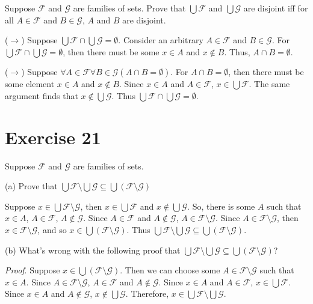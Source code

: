 \documentclass[11pt]{article}
\newcommand{\family}[1]{\mathcal{#1}}
\begin{document}
Suppose $\family{F}$ and $\family{G}$ are families of sets. Prove that 
$\bigcup \family{F}$ and $\bigcup \family{G}$ are disjoint iff for all 
$A \in \family{F}$ and $B \in \family{G}$, $A$ and $B$ are disjoint.

($\rightarrow$) Suppose $\bigcup \family{F} \cap \bigcup \family{G} = \emptyset$.
Consider an arbitrary $A \in \family{F}$ and $B \in \family{G}$. For 
$\bigcup \family{F} \cap \bigcup \family{G} = \emptyset$, then there must be 
some $x \in A$ and $x \notin B$. Thus, $A \cap B = \emptyset$.

($\rightarrow$) Suppose 
$\forall A \in \family{F} \forall B \in \family{G} (A \cap B = \emptyset)$. For 
$A \cap B = \emptyset$, then there must be some element $x \in A$ and $x \notin B$.
Since $x \in A$ and $A \in \family{F}$, $x \in \bigcup \family{F}$. The same 
argument finds that $x \notin \bigcup \family{G}$. 
Thus $\bigcup \family{F} \cap \bigcup \family{G} = \emptyset$.

\section*{Exercise 21}

Suppose $\family{F}$ and $\family{G}$ are families of sets.

\noindent (a) Prove that 
$\bigcup \family{F} \setminus \bigcup \family{G} \subseteq \bigcup (\family{F} \setminus \family{G})$

Suppose $x \in \bigcup \family{F} \setminus \family{G}$, then 
$x \in \bigcup \family{F}$ and $x \notin \bigcup \family{G}$. So, there is some 
$A$ such that $x \in A$, $A \in \family{F}$, $A \notin \family{G}$. Since 
$A \in \family{F}$ and $A \notin \family{G}$, 
$A \in \family{F} \setminus \family{G}$. Since 
$A \in \family{F} \setminus \family{G}$, then 
$x \in \family{F} \setminus \family{G}$, and so 
$x \in \bigcup (\family{F} \setminus \family{G})$. Thus 
$\bigcup \family{F} \setminus \bigcup \family{G} \subseteq \bigcup (\family{F} \setminus \family{G})$.

\noindent (b) What's wrong with the following proof that 
$\bigcup \family{F} \setminus \bigcup \family{G} \subseteq \bigcup (\family{F} \setminus \family{G})$?

\textit{Proof}. Suppose $x \in \bigcup (\family{F} \setminus \family{G})$. 
Then we can choose some $A \in \family{F} \setminus \family{G}$ such that 
$x \in A$. Since $A \in \family{F} \setminus \family{G}$, $A \in \family{F}$
and $A \notin \family{G}$. Since $x \in A$ and $A \in \family{F}$, 
$x \in \bigcup \family{F}$. Since $x \in A$ and $A \notin \family{G}$,
$x \notin \bigcup \family{G}$. Therefore, 
$x \in \bigcup \family{F} \setminus \bigcup \family{G}$.
\end{document}
